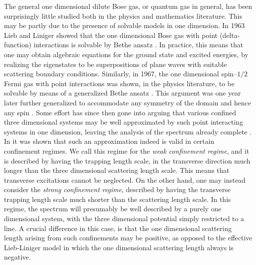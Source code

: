 The general one dimensional dilute Bose gas, or quantum gas in general, has been surprisingly little studied both in the physics and mathematics literature. This may be partly due to the presence of solvable models in one dimension. In 1963 Lieb and Liniger showed that the one dimensional Bose gas with point (delta-function) interactions is solvable by Bethe ansatz \cite{lieb1963exact}. In practice, this means that one may obtain algebraic equations for the ground state and excited energies, by realizing the eigenstates to be superpositions of plane waves with suitable scattering boundary conditions. Similarly, in 1967, the one dimensional spin--$ 1/2 $ Fermi gas with point interactions was shown, in the physics literature, to be solvable by means of a generalized Bethe ansatz \cite{yang1967some}. This argument was one year later further generalized to accommodate any symmetry of the domain and hence any spin \cite{sutherland1968further}. Some effort has since then gone into arguing that various confined three dimensional systems may be well approximated by such point interacting systems in one dimension, leaving the analysis of the spectrum already complete \cite{olshanii1998atomic,petrov2000regimes,dunjko2001bosons,lieb2003one,lieb2004one,seiringer2008lieb}. In \cite{lieb2003one,lieb2004one,seiringer2008lieb} it was shown that such an approximation indeed is valid in certain confinement regimes. We call this regime for the \emph{weak confinement regime}, and it is described by having the trapping length scale, in the transverse direction much longer than the three dimensional scattering length scale. This means that transverse excitations cannot be neglected. On the other hand, one may instead consider the \emph{strong confinement regime}, described by having the transverse trapping length scale much shorter than the scattering length scale. In this regime, the spectrum will presumably be well described by a purely one dimensional system, with the three dimensional potential simply restricted to a line. A crucial difference in this case, is that the one dimensional scattering length arising from such confinements may be positive, as opposed to the effective Lieb-Liniger model in which the one dimensional scattering length always is negative.\\
